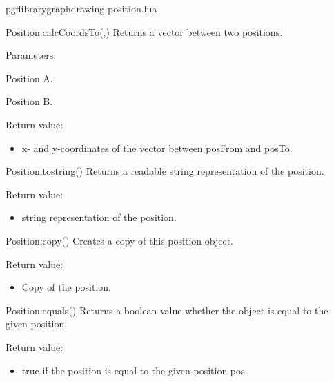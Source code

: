 
\begin{filedescription}{pgflibrarygraphdrawing-position.lua}


\begin{luacommand}{{Position.calcCoordsTo}(,)}
Returns a vector between two positions.

Parameters:
\begin{parameterdescription}
	\item[\meta{posFrom}] Position A.\item[\meta{posTo}] Position B.
\end{parameterdescription}


Return value:
\begin{itemize} \item[] x- and y-coordinates of the vector between posFrom and posTo. \end{itemize}


\end{luacommand}\begin{luacommand}{{Position:\textunderscore{}\textunderscore{}tostring}()}
Returns a readable string representation of the position.


Return value:
\begin{itemize} \item[] string representation of the position. \end{itemize}


\end{luacommand}\begin{luacommand}{{Position:copy}()}
Creates a copy of this position object.


Return value:
\begin{itemize} \item[] Copy of the position. \end{itemize}


\end{luacommand}\begin{luacommand}{{Position:equals}()}
Returns a boolean value whether the object is equal to the given position.


Return value:
\begin{itemize} \item[] true if the position is equal to the given position pos. \end{itemize}



\end{luacommand}
\end{filedescription}
